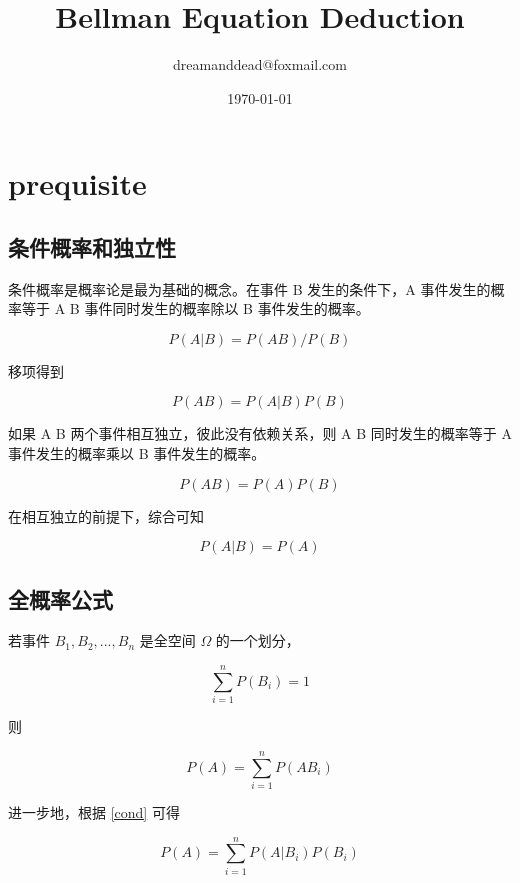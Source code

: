 \documentclass{article}
\title{Bellman Equation Deduction}
\author{dreamanddead@foxmail.com}
\date{\today}
\begin{document}
 
\maketitle



\section{prequisite}

\subsection{条件概率和独立性}

条件概率是概率论是最为基础的概念。在事件 B 发生的条件下，A 事件发生的概率等于 A B 事件同时发生的概率除以 B 事件发生的概率。

$$
P(A|B) = P(AB) / P(B)
$$

移项得到

\begin{equation} \label{cond}
 P(AB) = P(A|B)P(B)
\end{equation}

如果 A B 两个事件相互独立，彼此没有依赖关系，则 A B 同时发生的概率等于 A 事件发生的概率乘以 B 事件发生的概率。

$$
P(AB) = P(A)P(B)
$$

在相互独立的前提下，综合可知

\begin{equation} \label{ind}
 P(A|B) = P(A)
\end{equation}


\subsection{全概率公式}

若事件 $B_1, B_2, ..., B_n$ 是全空间 $\Omega$ 的一个划分，
 
$$
\sum_{i=1}^n P(B_i) = 1
$$
 
则

$$
P(A) = \sum_{i=1}^n P(AB_i)
$$
 
进一步地，根据 \cref{cond} 可得
 
\begin{equation} \label{full}
 P(A) = \sum_{i=1}^n P(A | B_i) P(B_i)
\end{equation}
\end{document}
